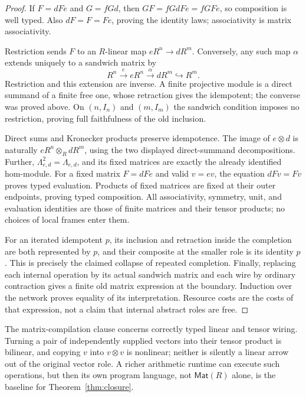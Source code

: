 \documentclass[11pt]{article}
\theoremstyle{definition}
\theoremstyle{remark}
\newcommand{\Mat}{\mathsf{Mat}}
\begin{document}
\begin{proof}
If $F=dFe$ and $G=fGd$, then $GF=fGdFe=fGFe$, so composition is well typed. Also $dF=F=Fe$, proving the identity laws; associativity is matrix associativity.

Restriction sends $F$ to an $R$-linear map $eR^n\to dR^m$. Conversely, any such map $\alpha$ extends uniquely to a sandwich matrix by
\[
 R^n\xrightarrow{e}eR^n\xrightarrow{\alpha}dR^m\hookrightarrow R^m.
\]
Restriction and this extension are inverse. A finite projective module is a direct summand of a finite free one, whose retraction gives the idempotent; the converse was proved above. On $(n,I_n)$ and $(m,I_m)$ the sandwich condition imposes no restriction, proving full faithfulness of the old inclusion.

Direct sums and Kronecker products preserve idempotence. The image of $e\otimes d$ is naturally $eR^n\otimes_R dR^m$, using the two displayed direct-summand decompositions. Further, $\Lambda_{e,d}^2=\Lambda_{e,d}$, and its fixed matrices are exactly the already identified hom-module. For a fixed matrix $F=dFe$ and valid $v=ev$, the equation $dFv=Fv$ proves typed evaluation. Products of fixed matrices are fixed at their outer endpoints, proving typed composition. All associativity, symmetry, unit, and evaluation identities are those of finite matrices and their tensor products; no choices of local frames enter them.

For an iterated idempotent $p$, its inclusion and retraction inside the completion are both represented by $p$, and their composite at the smaller role is its identity $p$. This is precisely the claimed collapse of repeated completion. Finally, replacing each internal operation by its actual sandwich matrix and each wire by ordinary contraction gives a finite old matrix expression at the boundary. Induction over the network proves equality of its interpretation. Resource costs are the costs of that expression, not a claim that internal abstract roles are free.
\end{proof}

The matrix-compilation clause concerns correctly typed linear and tensor wiring. Turning a pair of independently supplied vectors into their tensor product is bilinear, and copying $v$ into $v\otimes v$ is nonlinear; neither is silently a linear arrow out of the original vector role. A richer arithmetic runtime can execute such operations, but then its own program language, not $\Mat(R)$ alone, is the baseline for Theorem~\ref{thm:closure}.
\end{document}
